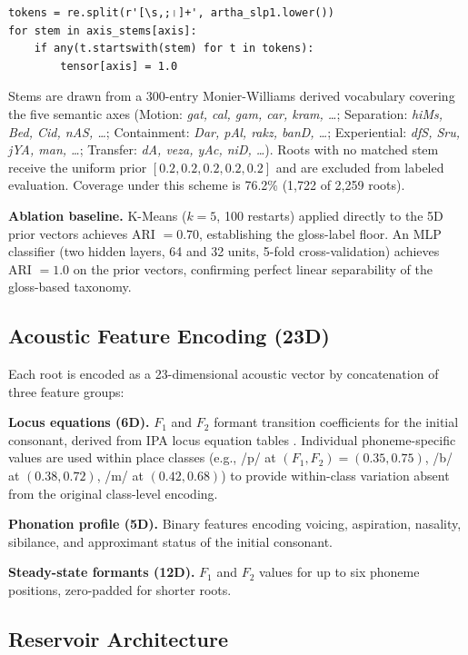 \documentclass{article}
\begin{document}
\begin{verbatim}
tokens = re.split(r'[\s,;।]+', artha_slp1.lower())
for stem in axis_stems[axis]:
    if any(t.startswith(stem) for t in tokens):
        tensor[axis] = 1.0
\end{verbatim}

Stems are drawn from a 300-entry Monier-Williams derived vocabulary
covering the five semantic axes (Motion: \textit{gat, cal, gam, car,
kram, \ldots}; Separation: \textit{hiMs, Bed, Cid, nAS, \ldots};
Containment: \textit{Dar, pAl, rakz, banD, \ldots}; Experiential:
\textit{dfS, Sru, jYA, man, \ldots}; Transfer: \textit{dA, veza, yAc,
niD, \ldots}). Roots with no matched stem receive the uniform prior
$[0.2, 0.2, 0.2, 0.2, 0.2]$ and are excluded from labeled evaluation.
Coverage under this scheme is 76.2\% (1,722 of 2,259 roots).

\textbf{Ablation baseline.} K-Means ($k=5$, 100 restarts) applied
directly to the 5D prior vectors achieves ARI $= 0.70$, establishing
the gloss-label floor. An MLP classifier (two hidden layers, 64 and 32
units, 5-fold cross-validation) achieves ARI $= 1.0$ on the prior
vectors, confirming perfect linear separability of the gloss-based
taxonomy.

\subsection{Acoustic Feature Encoding (23D)}

Each root is encoded as a 23-dimensional acoustic vector by
concatenation of three feature groups:

\textbf{Locus equations (6D).} $F_1$ and $F_2$ formant transition
coefficients for the initial consonant, derived from IPA locus equation
tables \citep{sussman1991}. Individual phoneme-specific values are used
within place classes (e.g., /p/ at $(F_1, F_2) = (0.35, 0.75)$,
/b/ at $(0.38, 0.72)$, /m/ at $(0.42, 0.68)$) to provide
within-class variation absent from the original class-level encoding.

\textbf{Phonation profile (5D).} Binary features encoding voicing,
aspiration, nasality, sibilance, and approximant status of the initial
consonant.

\textbf{Steady-state formants (12D).} $F_1$ and $F_2$ values for up
to six phoneme positions, zero-padded for shorter roots.

\subsection{Reservoir Architecture}
\end{document}

